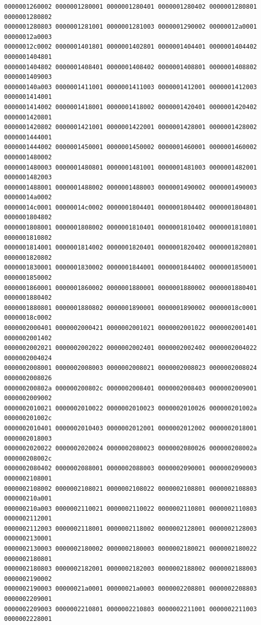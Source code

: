 \begin{Verbatim}[fontsize=\scriptsize]
0000001260002 0000001280001 0000001280401 0000001280402 0000001280801 0000001280802
0000001280803 0000001281001 0000001281003 0000001290002 00000012a0001 00000012a0003
00000012c0002 0000001401801 0000001402801 0000001404401 0000001404402 0000001404801
0000001404802 0000001408401 0000001408402 0000001408801 0000001408802 0000001409003
000000140a003 0000001411001 0000001411003 0000001412001 0000001412003 0000001414001
0000001414002 0000001418001 0000001418002 0000001420401 0000001420402 0000001420801
0000001420802 0000001421001 0000001422001 0000001428001 0000001428002 0000001444001
0000001444002 0000001450001 0000001450002 0000001460001 0000001460002 0000001480002
0000001480003 0000001480801 0000001481001 0000001481003 0000001482001 0000001482003
0000001488001 0000001488002 0000001488003 0000001490002 0000001490003 00000014a0002
00000014c0001 00000014c0002 0000001804401 0000001804402 0000001804801 0000001804802
0000001808001 0000001808002 0000001810401 0000001810402 0000001810801 0000001810802
0000001814001 0000001814002 0000001820401 0000001820402 0000001820801 0000001820802
0000001830001 0000001830002 0000001844001 0000001844002 0000001850001 0000001850002
0000001860001 0000001860002 0000001880001 0000001880002 0000001880401 0000001880402
0000001880801 0000001880802 0000001890001 0000001890002 00000018c0001 00000018c0002
0000002000401 0000002000421 0000002001021 0000002001022 0000002001401 0000002001402
0000002002021 0000002002022 0000002002401 0000002002402 0000002004022 0000002004024
0000002008001 0000002008003 0000002008021 0000002008023 0000002008024 0000002008026
000000200802a 000000200802c 0000002008401 0000002008403 0000002009001 0000002009002
0000002010021 0000002010022 0000002010023 0000002010026 000000201002a 000000201002c
0000002010401 0000002010403 0000002012001 0000002012002 0000002018001 0000002018003
0000002020022 0000002020024 0000002080023 0000002080026 000000208002a 000000208002c
0000002080402 0000002088001 0000002088003 0000002090001 0000002090003 0000002108001
0000002108002 0000002108021 0000002108022 0000002108801 0000002108803 000000210a001
000000210a003 0000002110021 0000002110022 0000002110801 0000002110803 0000002112001
0000002112003 0000002118001 0000002118002 0000002128001 0000002128003 0000002130001
0000002130003 0000002180002 0000002180003 0000002180021 0000002180022 0000002180801
0000002180803 0000002182001 0000002182003 0000002188002 0000002188003 0000002190002
0000002190003 00000021a0001 00000021a0003 0000002208801 0000002208803 0000002209001
0000002209003 0000002210801 0000002210803 0000002211001 0000002211003 0000002228001

\end{Verbatim}

